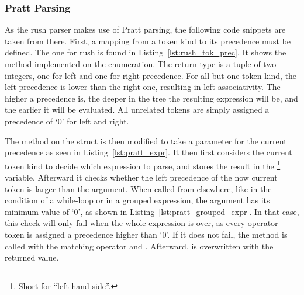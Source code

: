\subsubsection{Pratt Parsing}

As the rush parser makes use of Pratt parsing, the following code snippets are taken from there.
First, a mapping from a token kind to its precedence must be defined.
The one for rush is found in Listing~\ref{lst:rush_tok_prec}.
It shows the  method implemented on the  enumeration.
The return type is a tuple of two integers, one for left and one for right precedence.
For all but one token kind, the left precedence is lower than the right one, resulting in left-associativity.
The higher a precedence is, the deeper in the tree the resulting expression will be, and the earlier it will be evaluated.
All unrelated tokens are simply assigned a precedence of `0' for left and right.


The  method on the  struct is then modified to take a parameter for the current precedence as seen in Listing~\ref{lst:pratt_expr}.
It then first considers the current token kind to decide which expression to parse, and stores the result in the \footnote{Short for \enquote{left-hand side}.} variable.
Afterward it checks whether the left precedence of the now current token is larger than the  argument.
When called from elsewhere, like in the condition of a while-loop or in a grouped expression, the  argument has its minimum value of `0', as shown in Listing~\ref{lst:pratt_grouped_expr}.
In that case, this check will only fail when the whole expression is over, as every operator token is assigned a precedence higher than `0'.
If it does not fail, the  method is called with the matching operator and .
Afterward,  is overwritten with the returned value.




